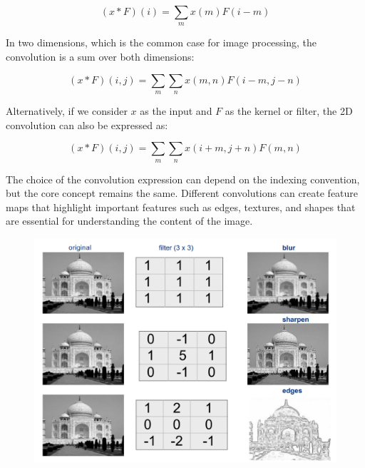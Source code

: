 \[
(x * F)(i) = \sum_m x(m) F(i - m)
\]

In two dimensions, which is the common case for image processing, the convolution is a sum over both dimensions:

\[
(x * F)(i, j) = \sum_m \sum_n x(m, n) F(i - m, j - n)
\]

Alternatively, if we consider \( x \) as the input and \( F \) as the kernel or filter, the 2D convolution can also be expressed as:

\[
(x * F)(i, j) = \sum_m \sum_n x(i + m, j + n) F(m, n)
\]

The choice of the convolution expression can depend on the indexing convention, but the core concept remains the same. Different convolutions can create feature maps that highlight important features such as edges, textures, and shapes that are essential for understanding the content of the image.

\begin{figure}[H]
    \centering
    \includegraphics[width=0.75\linewidth]{img/kernels.png}
    
\end{figure}


